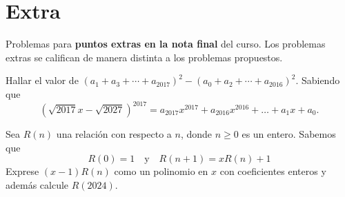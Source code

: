 \section{Extra}

Problemas para \textbf{puntos extras en la nota final} del curso.
Los problemas extras se califican de manera distinta a los problemas propuestos.

\begin{problem}
    Hallar el valor de $(a_1 + a_3 + \cdots + a_{2017})^2 - (a_0 + a_2 + \cdots + a_{2016})^2$.
    Sabiendo que
    \[
        \left(\sqrt {2017} x - \sqrt {2027}\right)^{2017} = a_{2017} x^{2017} + a_{2016} x^{2016} + \ldots + a_1 x + a_0.
    \]
\end{problem}

\begin{problem}
    Sea $R(n)$ una relación con respecto a $n$, donde $n \geq 0$ es un entero.
    Sabemos que
    \[
        R(0) = 1 \quad\text{y}\quad R(n + 1) = xR(n) + 1
    \]
    Exprese $(x - 1)R(n)$ como un polinomio en $x$ con coeficientes enteros y además calcule $R(2024)$.
\end{problem}